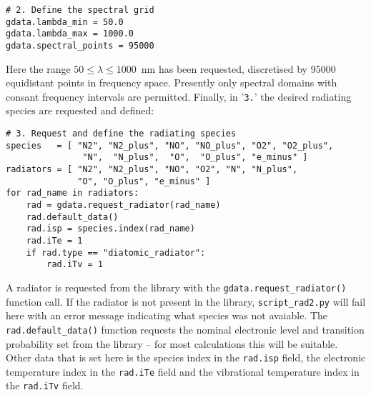 \begin{lstlisting}[basicstyle=\ttfamily\small]
# 2. Define the spectral grid
gdata.lambda_min = 50.0
gdata.lambda_max = 1000.0
gdata.spectral_points = 95000
\end{lstlisting}

\noindent Here the range $50 \leq \lambda \leq 1000$~nm has been requested, discretised by 95000 equidistant points in frequency space.
Presently only spectral domains with consant frequency intervals are permitted.
Finally, in '\texttt{3.}' the desired radiating species are requested and defined:

\begin{lstlisting}[basicstyle=\ttfamily\small]
# 3. Request and define the radiating species
species   = [ "N2", "N2_plus", "NO", "NO_plus", "O2", "O2_plus",
               "N",  "N_plus",  "O",  "O_plus", "e_minus" ]
radiators = [ "N2", "N2_plus", "NO", "O2", "N", "N_plus",
              "O", "O_plus", "e_minus" ]
for rad_name in radiators:
    rad = gdata.request_radiator(rad_name)
    rad.default_data()
    rad.isp = species.index(rad_name)
    rad.iTe = 1
    if rad.type == "diatomic_radiator":
        rad.iTv = 1
\end{lstlisting}

A radiator is requested from the library with the \texttt{gdata.request\_radiator()} function call.
If the radiator is not present in the library, \texttt{script\_rad2.py} will fail here with an error message indicating what species was not avaiable.  
The \texttt{rad.default\_data()} function requests the nominal electronic level and transition probability set from the library -- for most calculations this will be suitable.
Other data that is set here is the species index in the \texttt{rad.isp} field, the electronic temperature index in the \texttt{rad.iTe} field and the vibrational temperature index in the \texttt{rad.iTv} field.  